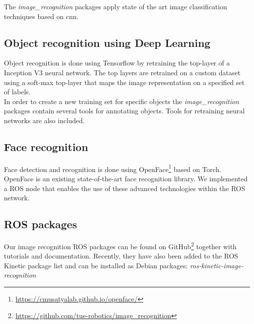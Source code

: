 The \emph{image\_recognition} packages apply state of the art image classification techniques based on \acrfull{cnn}.

\subsection{Object recognition using Deep Learning}
Object recognition is done using Tensorflow\texttrademark\hspace{0em} by retraining the top-layer of a Inception V3 neural network. The top layers are retrained on a custom dataset using a soft-max top-layer that maps the image representation on a specified set of labels.
\\
In order to create a new training set for specific objects the \emph{image\_recognition} packages contain several tools for annotating objects. Tools for retraining neural networks are also included.

\subsection{Face recognition}
Face detection and recognition is done using OpenFace\footnote{\url{https://cmusatyalab.github.io/openface/}} based on Torch. OpenFace is an existing state-of-the-art face recognition library. We implemented a ROS node that enables the use of these advanced technologies within the ROS network.
\subsection{ROS packages}
Our image recognition ROS packages can be found on GitHub\footnote{\url{https://github.com/tue-robotics/image_recognition}} together with tutorials and documentation. Recently, they have also been added to the ROS Kinetic package list and can be installed as Debian packages: \emph{ros-kinetic-image-recognition} 